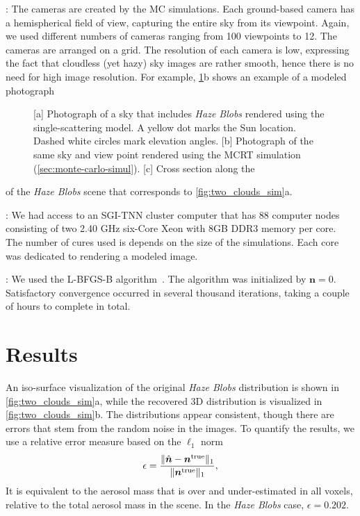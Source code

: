 \documentclass[10pt,letterpaper]{article}
\newcommand{\yoavcomment}[1]{}
\renewcommand{\yoavcomment}[1]{#1} %
\begin{document}
: The cameras are created by the MC simulations.
Each ground-based camera has a hemispherical field of view, capturing
the entire sky from its viewpoint. Again, we used different numbers of
cameras ranging from 100 viewpoints to 12. The cameras are arranged on
a grid.  The resolution of each camera is low, expressing the fact
that cloudless (yet hazy) sky images are rather smooth, hence there is
no need for high image resolution.  For example,
\cref{fig:simulation-results1}b shows an example of a modeled
photograph
\begin{figure}
  \centering
  \yoavcomment{\def\svgwidth{0.95\columnwidth}}
  \caption{\small [a] Photograph of a sky that includes {\em Haze
      Blobs} rendered using the single-scattering model.  A yellow dot
    marks the Sun location. Dashed white circles mark elevation
    angles.  [b] Photograph of the same sky and view point rendered
    using the MCRT simulation (\cref{sec:monte-carlo-simul}).
    [c] Cross section along the
  }
  \label{fig:simulation-results1}
\end{figure}
of the {\em Haze Blobs} scene that corresponds to
\cref{fig:two_clouds_sim}a.

: We had access to an SGI-TNN cluster computer
that has 88 computer nodes consisting of two 2.40 GHz six-Core Xeon
with 8GB DDR3 memory per core. The number of cures used is depends on
the size of the simulations. Each core was dedicated to rendering a
modeled image.

: We used the L-BFGS-B
algorithm~\cite{BFGS}. The algorithm was initialized by ${\bm
  n}=0$. Satisfactory convergence occurred in several thousand
iterations, taking a couple of hours to complete in total.


\section{Results}
\label{sec:optimization-results}

An iso-surface visualization of the original {\em Haze Blobs}
distribution is shown in \cref{fig:two_clouds_sim}a, while the
recovered 3D distribution is visualized in
\cref{fig:two_clouds_sim}b. The distributions appear consistent,
though there are errors that stem from the random noise in the
images. To quantify the results, we use a relative error measure based
on the $\ell_1$ norm
\begin{equation}
  \label{eq:ndiff}
  \epsilon=\frac{\| \hat{\bm n}  - {\bm n}^{\rm true} \|_1}
  {\| {\bm n}^{\rm true} \|_1} ,
\end{equation}
It is equivalent to the aerosol mass that is over and under-estimated
in all voxels, relative to the total aerosol mass in the scene.  In
the {\em Haze Blobs} case, $\epsilon=0.202$.
\end{document}
